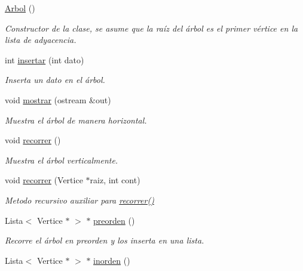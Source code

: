 \begin{DoxyCompactItemize}
\item 
\mbox{\label{classArbol_a4f5d3e25a0e1a40cb09cefa39378b7be}} 
\hyperlink{classArbol_a4f5d3e25a0e1a40cb09cefa39378b7be}{Arbol} ()
\begin{DoxyCompactList}\small\item\em Constructor de la clase, se asume que la raíz del árbol es el primer vértice en la lista de adyacencia. \end{DoxyCompactList}\item 
int \hyperlink{classArbol_af332559b5f9d894ecc6a707bb1550ae2}{insertar} (int dato)
\begin{DoxyCompactList}\small\item\em Inserta un dato en el árbol. \end{DoxyCompactList}\item 
void \hyperlink{classArbol_a61749974f55056420f4e5a76eb664809}{mostrar} (ostream \&out)
\begin{DoxyCompactList}\small\item\em Muestra el árbol de manera horizontal. \end{DoxyCompactList}\item 
\mbox{\label{classArbol_a5bd356760f63521e8578a83613aa4792}} 
void \hyperlink{classArbol_a5bd356760f63521e8578a83613aa4792}{recorrer} ()
\begin{DoxyCompactList}\small\item\em Muestra el árbol verticalmente. \end{DoxyCompactList}\item 
void \hyperlink{classArbol_a0ae46c572d300cd4a5f27b7d00a1a14e}{recorrer} (Vertice $\ast$raiz, int cont)
\begin{DoxyCompactList}\small\item\em Metodo recursivo auxiliar para \hyperlink{classArbol_a5bd356760f63521e8578a83613aa4792}{recorrer()} \end{DoxyCompactList}\item 
Lista$<$ Vertice $\ast$ $>$ $\ast$ \hyperlink{classArbol_a0ffdc60ce8f2267366681cc94cf6beea}{preorden} ()
\begin{DoxyCompactList}\small\item\em Recorre el árbol en preorden y los inserta en una lista. \end{DoxyCompactList}\item 
Lista$<$ Vertice $\ast$ $>$ $\ast$ \hyperlink{classArbol_a80a0c3cf2d7f3e92a5c8e5504947dab5}{inorden} ()

\end{DoxyCompactItemize}
